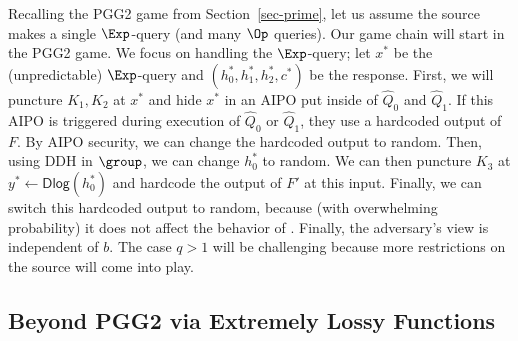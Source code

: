 Recalling the PGG2 game from Section~\ref{sec-prime}, let us assume the source makes a single $\Exp$-query (and many  $\Op$ queries). Our game chain will start in the PGG2 game. We focus on handling the $\Exp$-query;   let  $x^*$  be the (unpredictable) $\Exp$-query and $(h_0^*,h_1^*,h_2^*,c^*)$ be the response.  First, we will puncture $K_1,K_2$ at $x^*$ and hide $x^*$ in an AIPO put inside of $\widehat{Q}_0$ and $\widehat{Q}_1$. If this AIPO is triggered during execution of $\widehat{Q}_0$ or $\widehat{Q}_1$, they use a hardcoded output of $F$. By  AIPO security, we can change the hardcoded output to random. Then, using DDH in $\group$, we can change $h_0^*$ to random. We can then puncture $K_3$ at $y^* \gets \mathsf{Dlog}(h_0^*)$ and hardcode the output of $F'$ at this input.  Finally, we can switch this hardcoded output to random, because (with overwhelming probability) it does not affect the behavior of . Finally, the adversary's view is independent of $b$. 
The case $q >1$ will be challenging because more restrictions on the source will come into play.




    \subsection{Beyond PGG2 via Extremely Lossy Functions} \label{sec-beyond}

